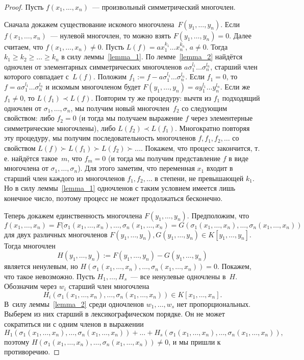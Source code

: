 \documentclass[a4paper, 12pt]{article}
\theoremstyle{definition}
\theoremstyle{remark}
\begin{document}
\begin{proof}
Пусть $f(x_1, \ldots, x_n)$~--- произвольный симметрический
многочлен.

Сначала докажем существование искомого многочлена~$F(y_1, \ldots,
y_n)$. Если $f(x_1, \ldots, x_n)$~--- нулевой многочлен, то можно
взять $F(y_1,\ldots, y_n) = 0$. Далее считаем, что $f(x_1, \ldots,
x_n) \ne 0$. Пусть $L(f) = ax_1^{k_1} \ldots x_n^{k_n}$, $a \ne 0$.
Тогда $k_1 \geqslant k_2 \geqslant \ldots \geqslant k_n$ в силу
леммы~\ref{lemma_1}. По лемме~\ref{lemma_2} найдётся одночлен от
элементарных симметрических многочленов
$a\sigma_1^{l_1}\ldots\sigma_n^{l_n}$, старший член которого
совпадает с~$L(f)$. Положим $f_1 := f -
a\sigma_1^{l_1}\ldots\sigma_n^{l_n}$. Если $f_1 = 0$, то $f = a
\sigma_1^{l_1} \ldots \sigma_n^{l_n}$ и искомым многочленом будет
$F(y_1, \ldots, y_n) = ay_1^{l_1} \ldots y_n^{l_n}$. Если же $f_1 \ne 0$, то $L(f_1) \prec L(f)$. Повторим ту же процедуру: вычтя из
$f_1$ подходящий одночлен от $\sigma_1, \ldots, \sigma_n$, мы
получим новый многочлен~$f_2$ со следующим свойством: либо $f_2 = 0$
(и тогда мы получаем выражение $f$ через элементерные симметрические
многочлены), либо $L(f_2) \prec L(f_1)$. Многократно повторяя эту
процедуру, мы получим последовательность многочленов $f, f_1, f_2,
\ldots$ со свойством $L(f) \succ L(f_1) \succ L(f_2) \succ \ldots$.
Покажем, что процесс закончится, т.\,е. найдётся такое~$m$, что $f_m
= 0$ (и тогда мы получим представление $f$ в виде многочлена от
$\sigma_1, \ldots, \sigma_n$). Для этого заметим, что переменная
$x_1$ входит в старший член каждого из многочленов $f_1, f_2,
\ldots$ в степени, не превышающей $k_1$. Но в силу
леммы~\ref{lemma_1} одночленов с таким условием имеется лишь
конечное число, поэтому процесс не может продолжаться бесконечно.

Теперь докажем единственность многочлена $F(y_1, \ldots, y_n)$.
Предположим, что
$$
f(x_1, \ldots, x_n) = F(\sigma_1(x_1, \ldots, x_n), \ldots,
\sigma_n(x_1, \ldots, x_n) = G(\sigma_1(x_1, \ldots, x_n), \ldots,
\sigma_n(x_1, \ldots, x_n))
$$
для двух различных многочленов $F(y_1, \ldots, y_n), G(y_1, \ldots,
y_n) \in K[y_1, \ldots, y_n]$. Тогда многочлен $$H(y_1, \ldots, y_n)
:= F(y_1, \ldots, y_n) - G(y_1, \ldots, y_n)$$ является ненулевым,
но $H(\sigma_1(x_1, \ldots, x_n), \ldots, \sigma_n(x_1, \ldots,
x_n)) = 0$. Покажем, что такое невозможно. Пусть $H_1, \ldots,
H_s$~--- все ненулевые одночлены в~$H$. Обозначим через $w_i$
старший член многочлена $$H_i(\sigma_1(x_1, \ldots, x_n), \ldots,
\sigma_n(x_1, \ldots, x_n)) \in K[x_1, \ldots, x_n].$$ В~силу
леммы~\ref{lemma_2} среди одночленов $w_1, \ldots, w_s$ нет
пропорциональных. Выберем из них старший в лексикографическом
порядке. Он не может сократиться ни с одним членов в выражении
$$
H_1(\sigma_1(x_1, \ldots, x_n), \ldots, \sigma_n(x_1, \ldots, x_n))
+ \ldots + H_s(\sigma_1(x_1, \ldots, x_n), \ldots, \sigma_n(x_1,
\ldots, x_n)),
$$
поэтому $H(\sigma_1(x_1, \ldots, x_n), \ldots, \sigma_n(x_1, \ldots,
x_n)) \ne 0$, и мы пришли к противоречию.
\end{proof}
\end{document}
